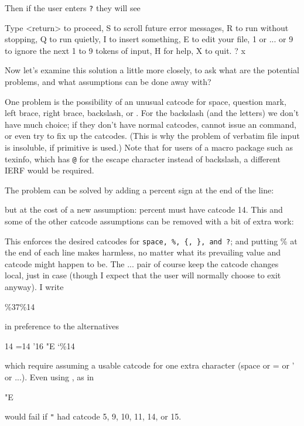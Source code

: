 Then if the user enters \texttt{?} they will see
\begin{lcode}
  Type <return> to proceed,
  S to scroll future error messages,
  R to run without stopping,
  Q to run quietly,
  I to insert something,
  E to edit your file,
  1 or ... or 9 to ignore the next 1 to 9 tokens of input,
  H for help, X to quit.
  ? x
\end{lcode}

Now let's examine this solution a little more closely, to ask what are
the potential problems, and what assumptions can be done away with?

One problem is the possibility of an unusual catcode for space, question
mark, left brace, right brace, backslash, or \cmd{\endlinechar}. For the
backslash (and the letters) we don't have much choice; if they don't
have normal catcodes,  cannot issue an \cmd{\errmessage} command, or even
try to fix up the catcodes. (This is why the problem of verbatim file
input is insoluble, if primitive \cmd{} is used.) Note that for users of
a macro package such as texinfo, which has \verb?@? for the escape character
instead of backslash, a different IERF would be required.

The \cmd{\endlinechar} problem can be solved by adding a percent sign at the
end of the line:
\begin{lcode}
\end{lcode}
but at the cost of a new assumption: percent must have catcode 14. This
and some of the other catcode assumptions can be removed with a bit of
extra work:
This enforces the desired catcodes for \verb|space, %, {, }, and ?|; and
putting \% at the end of each line makes \cmd{\endlinechar} harmless, no matter
what its prevailing value and catcode might happen to be. The
\cmd{\begingroup} ... \cmd{\endgroup} pair of course keep the catcode changes local,
just in case (though I expect that the user will normally choose to exit
anyway). I write
\begin{lcode}
  \chardef\%37\catcode\%14
\end{lcode}
in preference to the alternatives
\begin{lcode}
   14
  =14
  '16
  "E
  \catcode`\%14
\end{lcode}
which require assuming a usable catcode for one extra character (space
or = or ' or ...). Even using \cmd{\string}, as in
\begin{lcode}
  \string"E
\end{lcode}
would fail if \texttt{"} had catcode 5, 9, 10, 11, 14, or 15.

